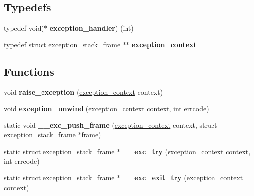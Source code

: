 \subsection*{Typedefs}
\begin{DoxyCompactItemize}
\item 
typedef void($\ast$ {\bfseries exception\+\_\+handler}) (int)\hypertarget{group__exceptions_ga07c60bc46505779b049ce597fe609258}{}\label{group__exceptions_ga07c60bc46505779b049ce597fe609258}

\item 
typedef struct \hyperlink{structexception__stack__frame}{exception\+\_\+stack\+\_\+frame} $\ast$$\ast$ {\bfseries exception\+\_\+context}\hypertarget{group__exceptions_ga644495f4913e96a83cdf2779fd813974}{}\label{group__exceptions_ga644495f4913e96a83cdf2779fd813974}

\end{DoxyCompactItemize}
\subsection*{Functions}
\begin{DoxyCompactItemize}
\item 
void {\bfseries raise\+\_\+exception} (\hyperlink{structexception__stack__frame}{exception\+\_\+context} context)\hypertarget{group__exceptions_ga7eda2653ee54e0c95e9d51b8fd873298}{}\label{group__exceptions_ga7eda2653ee54e0c95e9d51b8fd873298}

\item 
void {\bfseries exception\+\_\+unwind} (\hyperlink{structexception__stack__frame}{exception\+\_\+context} context, int errcode)\hypertarget{group__exceptions_ga5232fee2c414c5ff1ff44dc28c83cf42}{}\label{group__exceptions_ga5232fee2c414c5ff1ff44dc28c83cf42}

\item 
static void {\bfseries \+\_\+\+\_\+exc\+\_\+push\+\_\+frame} (\hyperlink{structexception__stack__frame}{exception\+\_\+context} context, struct \hyperlink{structexception__stack__frame}{exception\+\_\+stack\+\_\+frame} $\ast$frame)\hypertarget{group__exceptions_gad0ebd2587ae85b044e1306a026246a27}{}\label{group__exceptions_gad0ebd2587ae85b044e1306a026246a27}

\item 
static struct \hyperlink{structexception__stack__frame}{exception\+\_\+stack\+\_\+frame} $\ast$ {\bfseries \+\_\+\+\_\+exc\+\_\+try} (\hyperlink{structexception__stack__frame}{exception\+\_\+context} context, int errcode)\hypertarget{group__exceptions_ga47cfe7a060b16ac1cd9a4432853205dc}{}\label{group__exceptions_ga47cfe7a060b16ac1cd9a4432853205dc}

\item 
static struct \hyperlink{structexception__stack__frame}{exception\+\_\+stack\+\_\+frame} $\ast$ {\bfseries \+\_\+\+\_\+exc\+\_\+exit\+\_\+try} (\hyperlink{structexception__stack__frame}{exception\+\_\+context} context)\hypertarget{group__exceptions_ga9d85149bdb927245ff694068119412df}{}\label{group__exceptions_ga9d85149bdb927245ff694068119412df}

\end{DoxyCompactItemize}


